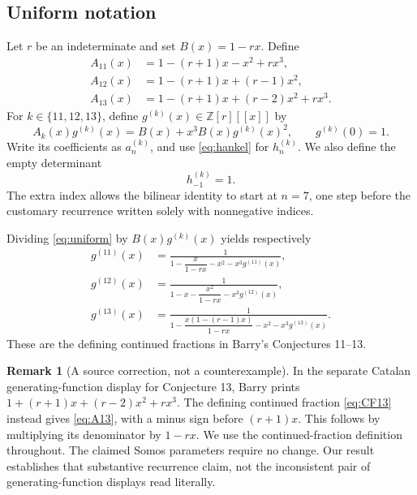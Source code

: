 \documentclass[11pt,letterpaper]{article}
\numberwithin{equation}{section}
\theoremstyle{definition}
\newtheorem{remark}[theorem]{Remark}
\newcommand{\Z}{\mathbb Z}
\begin{document}
\subsection{Uniform notation}

Let \(r\) be an indeterminate and set \(B(x)=1-rx\). Define
\begin{align}
 A_{11}(x)&=1-(r+1)x-x^2+rx^3,\label{eq:A11}\\
 A_{12}(x)&=1-(r+1)x+(r-1)x^2,\label{eq:A12}\\
 A_{13}(x)&=1-(r+1)x+(r-2)x^2+rx^3.\label{eq:A13}
\end{align}
For \(k\in\{11,12,13\}\), define \(g^{(k)}(x)\in\Z[r][[x]]\) by
\begin{equation}
 A_k(x)g^{(k)}(x)=B(x)+x^3B(x)g^{(k)}(x)^2,
 \qquad g^{(k)}(0)=1.
 \label{eq:uniform}
\end{equation}
Write its coefficients as \(a_n^{(k)}\), and use \eqref{eq:hankel} for
\(h_n^{(k)}\). We also define the empty determinant
\begin{equation}
 h_{-1}^{(k)}=1.
 \label{eq:empty}
\end{equation}
The extra index allows the bilinear identity to start at \(n=7\), one step
before the customary recurrence written solely with nonnegative indices.

Dividing \eqref{eq:uniform} by \(B(x)g^{(k)}(x)\) yields respectively
\begin{align}
 g^{(11)}(x)&=\frac1{1-\dfrac{x}{1-rx}-x^2-x^3g^{(11)}(x)},\label{eq:CF11}\\
 g^{(12)}(x)&=\frac1{1-x-\dfrac{x^2}{1-rx}-x^3g^{(12)}(x)},\label{eq:CF12}\\
 g^{(13)}(x)&=\frac1{1-\dfrac{x(1-(r-1)x)}{1-rx}-x^2-x^3g^{(13)}(x)}.
 \label{eq:CF13}
\end{align}
These are the defining continued fractions in Barry's Conjectures 11--13.

\begin{remark}[A source correction, not a counterexample]
In the separate Catalan generating-function display for Conjecture 13,
Barry prints \(1+(r+1)x+(r-2)x^2+rx^3\). The defining continued fraction
\eqref{eq:CF13} instead gives \eqref{eq:A13}, with a minus sign before
\((r+1)x\). This follows by multiplying its denominator by \(1-rx\).
We use the continued-fraction definition throughout. The claimed Somos
parameters require no change. Our result establishes that substantive
recurrence claim, not the inconsistent pair of generating-function displays
read literally.
\end{remark}
\end{document}
